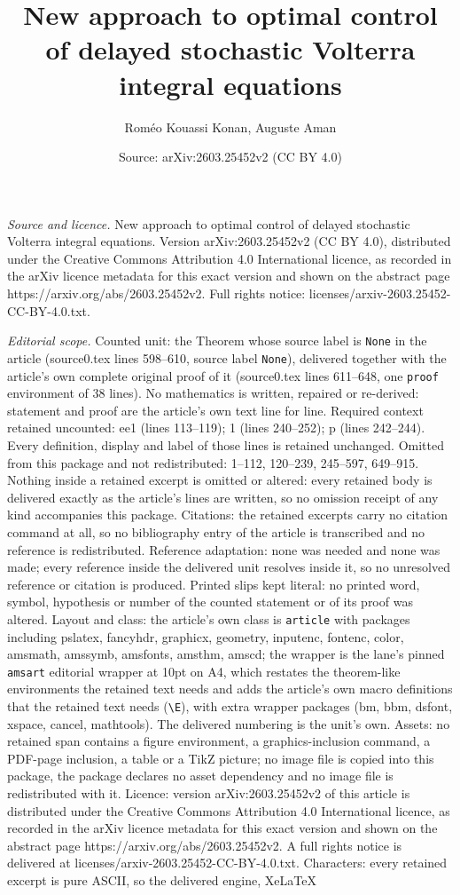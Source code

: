 \documentclass[10pt,a4paper]{amsart}
\title[New approach to optimal control of delayed stochastic Volter]{New approach to optimal control of delayed stochastic Volterra integral equations}
\author{Rom\'eo Kouassi Konan, Auguste Aman}
\date{Source: arXiv:2603.25452v2 (CC BY 4.0)}
\begin{document}
\maketitle

\noindent\emph{Source and licence.} New approach to optimal control of delayed stochastic Volterra integral equations. Version arXiv:2603.25452v2 (CC BY 4.0), distributed under the Creative Commons Attribution 4.0 International licence, as recorded in the arXiv licence metadata for this exact version and shown on the abstract page https://arxiv.org/abs/2603.25452v2. Full rights notice: licenses/arxiv-2603.25452-CC-BY-4.0.txt.\par\smallskip

\noindent\textit{Editorial scope.} Counted unit: the Theorem whose source label is \texttt{None} in the article (source0.tex lines 598--610, source label \texttt{None}), delivered together with the article's own complete original proof of it (source0.tex lines 611--648, one \texttt{proof} environment of 38 lines). No mathematics is written, repaired or re-derived: statement and proof are the article's own text line for line. Required context retained uncounted: ee1 (lines 113--119); 1 (lines 240--252); p (lines 242--244). Every definition, display and label of those lines is retained unchanged. Omitted from this package and not redistributed: 1--112, 120--239, 245--597, 649--915. Nothing inside a retained excerpt is omitted or altered: every retained body is delivered exactly as the article's lines are written, so no omission receipt of any kind accompanies this package. Citations: the retained excerpts carry no citation command at all, so no bibliography entry of the article is transcribed and no reference is redistributed. Reference adaptation: none was needed and none was made; every reference inside the delivered unit resolves inside it, so no unresolved reference or citation is produced. Printed slips kept literal: no printed word, symbol, hypothesis or number of the counted statement or of its proof was altered. Layout and class: the article's own class is \texttt{article} with packages including pslatex, fancyhdr, graphicx, geometry, inputenc, fontenc, color, amsmath, amssymb, amsfonts, amsthm, amscd; the wrapper is the lane's pinned \texttt{amsart} editorial wrapper at 10pt on A4, which restates the theorem-like environments the retained text needs and adds the article's own macro definitions that the retained text needs (\texttt{\textbackslash E}), with extra wrapper packages (bm, bbm, dsfont, xspace, cancel, mathtools). The delivered numbering is the unit's own. Assets: no retained span contains a figure environment, a graphics-inclusion command, a PDF-page inclusion, a table or a TikZ picture; no image file is copied into this package, the package declares no asset dependency and no image file is redistributed with it. Licence: version arXiv:2603.25452v2 of this article is distributed under the Creative Commons Attribution 4.0 International licence, as recorded in the arXiv licence metadata for this exact version and shown on the abstract page https://arxiv.org/abs/2603.25452v2. A full rights notice is delivered at licenses/arxiv-2603.25452-CC-BY-4.0.txt. Characters: every retained excerpt is pure ASCII, so the delivered engine, XeLaTeX 
\end{document}

